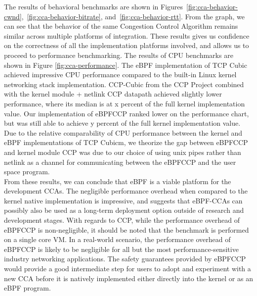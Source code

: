 \documentclass[../main.tex]{subfiles}
\begin{document}
The results of behavioral benchmarks are shown in Figures~\ref{fig:cca-behavior-cwnd},~\ref{fig:cca-behavior-bitrate}, and~\ref{fig:cca-behavior-rtt}. From the graph, we can see that the behavior of the same Congestion Control Algorithm remains similar across multiple platforms of integration. These results gives us confidence on the correctness of all the implementation platforms involved, and allows us to proceed to performance benchmarking. The results of CPU benchmarks are shown in Figure \ref{fig:cca-performance}. The eBPF implementation of TCP Cubic achieved impressive CPU performance compared to the built-in Linux kernel networking stack implementation. CCP-Cubic from the CCP Project \cite{generic-cong-avoid} combined with the kernel module + netlink CCP datapath achieved slightly lower performance, where its median is at x percent of the full kernel implementation value. Our implementation of eBPFCCP ranked lower on the performance chart, but was still able to achieve y percent of the full kernel implementation value. Due to the relative comparability of CPU performance between the kernel and eBPF implementations of TCP Cubicm, we theorize the gap between eBPFCCP and kernel module CCP was due to our choice of using unix pipes rather than netlink as a channel for communicating between the eBPFCCP and the user space program. \\
From these results, we can conclude that eBPF is a viable platform for the development CCAs. The negligible performance overhead when compared to the kernel native implementation is impressive, and suggests that eBPF-CCAs can possibly also be used as a long-term deployment option outside of research and development stages. With regards to CCP, while the performance overhead of eBPFCCP is non-negligible, it should be noted that the benchmark is performed on a single core VM. In a real-world scenario, the performance overhead of eBPFCCP is likely to be negligible for all but the most performance-sensitive industry networking applications. The safety guarantees provided by eBPFCCP would provide a good intermediate step for users to adopt and experiment with a new CCA before it is natively implemented either directly into the kernel or as an eBPF program. 
\end{document}
